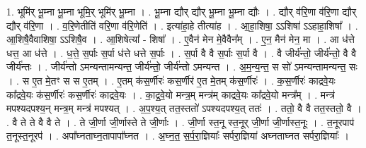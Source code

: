 \documentclass[17pt]{extarticle}
\begin{document}
1. भूमि॑र् भू॒म्ना भू॒म्ना भूमि॒र् भूमि॑र् भू॒म्ना । . भू॒म्ना द्यौर् द्यौर् भू॒म्ना भू॒म्ना द्यौः । . द्यौर् व॑रि॒णा व॑रि॒णा द्यौर् द्यौर् व॑रि॒णा । . व॒रि॒णेतीति॑ वरि॒णा व॑रि॒णेति॑ । . इत्या॑हा॒हे तीत्या॑ह । . आ॒हा॒शिषा॒ ऽऽशिषा॑ ऽऽहाहा॒शिषा᳚ । . आ॒शिषै॒वैवाशिषा॒ ऽऽशिषै॒व । . आ॒शिषेत्या᳚ - शिषा᳚ । . ए॒वैन॑ मेन मे॒वैवैन᳚म् । . ए॒न॒ मैन॑ मेन॒ मा । . आ ध॑त्ते धत्त॒ आ ध॑त्ते । . ध॒त्ते॒ स॒र्पाः स॒र्पा ध॑त्ते धत्ते स॒र्पाः । . स॒र्पा वै वै स॒र्पाः स॒र्पा वै । . वै जीर्य॑न्तो॒ जीर्य॑न्तो॒ वै वै जीर्य॑न्तः । . जीर्य॑न्तो ऽमन्यन्तामन्यन्त॒ जीर्य॑न्तो॒ जीर्य॑न्तो ऽमन्यन्त । . अ॒म॒न्य॒न्त॒ स सो॑ ऽमन्यन्तामन्यन्त॒ सः । . स ए॒त मे॒तꣳ स स ए॒तम् । . ए॒तम् क॑स॒र्णीरः॑ कस॒र्णीर॑ ए॒त मे॒तम् क॑स॒र्णीरः॑ । . क॒स॒र्णीरः॑ काद्रवे॒यः का᳚द्रवे॒यः क॑स॒र्णीरः॑ कस॒र्णीरः॑ काद्रवे॒यः । . का॒द्र॒वे॒यो मन्त्र॒म् मन्त्र॑म् काद्रवे॒यः का᳚द्रवे॒यो मन्त्र᳚म् । . मन्त्र॑ मपश्यदपश्य॒न् मन्त्र॒म् मन्त्र॑ मपश्यत् । . अ॒प॒श्य॒त् तत॒स्ततो॑ ऽपश्यदपश्य॒त् ततः॑ । . ततो॒ वै वै तत॒स्ततो॒ वै । . वै ते ते वै वै ते । . ते जी॒र्णा जी॒र्णास्ते ते जी॒र्णाः । . जी॒र्णा स्त॒नू स्त॒नूर् जी॒र्णा जी॒र्णास्त॒नूः । . त॒नूरपाप॑ त॒नूस्त॒नूरप॑ । . अपा᳚घ्नताघ्न॒तापापा᳚घ्नत । . अ॒घ्न॒त॒ स॒र्प॒रा॒ज्ञियाः᳚ सर्परा॒ज्ञिया॑ अघ्नताघ्नत सर्परा॒ज्ञियाः᳚ । \newline
\end{document}
